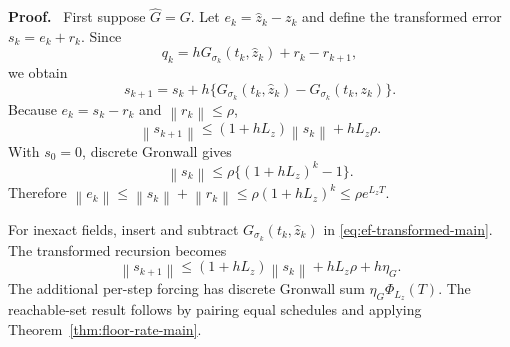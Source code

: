 \documentclass[twoside,11pt]{article}
\renewenvironment{proof}[1][Proof]{\par\noindent\textbf{#1.}\ }{\hfill\BlackBox\par\medskip}
\newcommand{\Rel}{\mathrm{rel}}
\newcommand{\norm}[1]{\left\lVert #1\right\rVert}
\newcommand{\RR}{\mathscr{R}}
\newcommand{\dH}{d_{\mathrm H}}
\begin{document}

\begin{proof}
First suppose $\widehat G=G$.  Let $e_k=\widehat z_k-z_k$ and define the transformed error $s_k=e_k+r_k$.  Since
\[
 q_k=hG_{\sigma_k}(t_k,\widehat z_k)+r_k-r_{k+1},
\]
we obtain
\begin{equation}
 s_{k+1}
 =s_k+h\{G_{\sigma_k}(t_k,\widehat z_k)
          -G_{\sigma_k}(t_k,z_k)\}.
 \label{eq:ef-transformed-main}
\end{equation}
Because $e_k=s_k-r_k$ and $\norm{r_k}\le\rho$,
\begin{equation}
 \norm{s_{k+1}}
 \le(1+hL_z)\norm{s_k}+hL_z\rho.
 \label{eq:ef-recursion-main}
\end{equation}
With $s_0=0$, discrete Gronwall gives
\[
 \norm{s_k}\le\rho\{(1+hL_z)^k-1\}.
\]
Therefore $\norm{e_k}\le\norm{s_k}+\norm{r_k}\le\rho(1+hL_z)^k\le\rho e^{L_zT}$.

For inexact fields, insert and subtract $G_{\sigma_k}(t_k,\widehat z_k)$ in \eqref{eq:ef-transformed-main}.  The transformed recursion becomes
\begin{equation}
 \norm{s_{k+1}}
 \le(1+hL_z)\norm{s_k}+hL_z\rho+h\eta_G.
 \label{eq:ef-recursion-inexact-main}
\end{equation}
The additional per-step forcing has discrete Gronwall sum $\eta_G\Phi_{L_z}(T)$.  The reachable-set result follows by pairing equal schedules and applying Theorem~\ref{thm:floor-rate-main}.
\end{proof}
\end{document}
